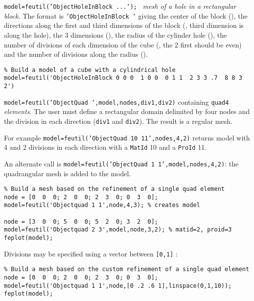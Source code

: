 {\tt model=feutil('ObjectHoleInBlock ...');}
 \hexah\ {\sl mesh of a hole in a rectangular block.} The format is {\tt 'ObjectHoleInBlock '} giving the center of the block (), the directions along the first and third dimensions of the block (, third dimension is along the hole), the 3 dimensions (), the radius of the cylinder hole (), the number of divisions of each dimension of the cube (, the 2 first should be even) and the number of divisions along the radius ().

\begin{verbatim}
% Build a model of a cube with a cylindrical hole
model=feutil('ObjectHoleInBlock 0 0 0  1 0 0  0 1 1  2 3 3 .7  8 8 3 2') 
\end{verbatim}%



{\tt model=feutil('ObjectQuad ',model,nodes,div1,div2)}
 containing {\tt quad4} {\sl elements}. The user must define a rectangular domain delimited by four nodes and the division in each direction ({\tt div1} and {\tt div2}). The result is a regular mesh. 

For example {\tt model=feutil('ObjectQuad 10 11',nodes,4,2)} returns model with 4 and 2 divisions in each direction with a {\tt MatId} 10 and a {\tt ProId} 11.

An alternate call is {\tt model=feutil('ObjectQuad 1 1',model,nodes,4,2)}: the quadrangular mesh is added to the model.

\begin{verbatim}
% Build a mesh based on the refinement of a single quad element
node = [0  0  0; 2  0  0; 2  3  0; 0  3  0];
model=feutil('Objectquad 1 1',node,4,3); % creates model 

node = [3  0  0; 5  0  0; 5  2  0; 3  2  0];
model=feutil('Objectquad 2 3',model,node,3,2); % matid=2, proid=3
feplot(model);
\end{verbatim}%


Divisions may be specified using a vector between {\tt [0,1]} :
\begin{verbatim}
% Build a mesh based on the custom refinement of a single quad element
node = [0  0  0; 2  0  0; 2  3  0; 0  3  0];
model=feutil('Objectquad 1 1',node,[0 .2 .6 1],linspace(0,1,10)); 
feplot(model);
\end{verbatim}%



